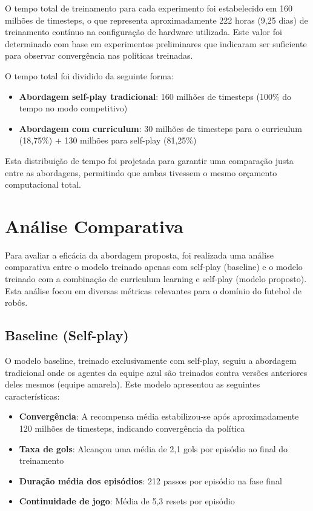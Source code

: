 O tempo total de treinamento para cada experimento foi estabelecido em 160 milhões de timesteps, o que representa aproximadamente 222 horas (9,25 dias) de treinamento contínuo na configuração de hardware utilizada. Este valor foi determinado com base em experimentos preliminares que indicaram ser suficiente para observar convergência nas políticas treinadas.

O tempo total foi dividido da seguinte forma:

\begin{itemize}
    \item \textbf{Abordagem self-play tradicional}: 160 milhões de timesteps (100\% do tempo no modo competitivo)
    \item \textbf{Abordagem com curriculum}: 30 milhões de timesteps para o curriculum (18,75\%) + 130 milhões para self-play (81,25\%)
\end{itemize}

Esta distribuição de tempo foi projetada para garantir uma comparação justa entre as abordagens, permitindo que ambas tivessem o mesmo orçamento computacional total.

\section{Análise Comparativa}
\label{sec:analise_comparativa}

Para avaliar a eficácia da abordagem proposta, foi realizada uma análise comparativa entre o modelo treinado apenas com self-play (baseline) e o modelo treinado com a combinação de curriculum learning e self-play (modelo proposto). Esta análise focou em diversas métricas relevantes para o domínio do futebol de robôs.

\subsection{Baseline (Self-play)}

O modelo baseline, treinado exclusivamente com self-play, seguiu a abordagem tradicional onde os agentes da equipe azul são treinados contra versões anteriores deles mesmos (equipe amarela). Este modelo apresentou as seguintes características:

\begin{itemize}
    \item \textbf{Convergência}: A recompensa média estabilizou-se após aproximadamente 120 milhões de timesteps, indicando convergência da política
    \item \textbf{Taxa de gols}: Alcançou uma média de 2,1 gols por episódio ao final do treinamento
    \item \textbf{Duração média dos episódios}: 212 passos por episódio na fase final
    \item \textbf{Continuidade de jogo}: Média de 5,3 resets por episódio
\end{itemize}

